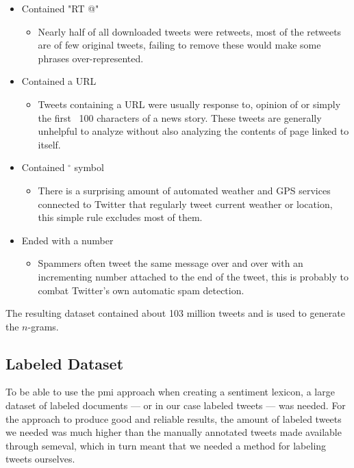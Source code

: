 \begin{itemize}
    \item Contained "RT @"
    \begin{itemize}
        \item Nearly half of all downloaded tweets were retweets, most of the retweets are of few original tweets, failing to remove these would make some phrases over-represented.
    \end{itemize}
    \item Contained a URL
    \begin{itemize}
        \item Tweets containing a URL were usually response to, opinion of or simply the first ~100 characters of a news story. These tweets are generally unhelpful to analyze without also analyzing the contents of page linked to itself. 
    \end{itemize}
    \item Contained $^{\circ}$ symbol
    \begin{itemize}
        \item There is a surprising amount of automated weather and GPS services connected to Twitter that regularly tweet current weather or location, this simple rule excludes most of them.
    \end{itemize}
    \item Ended with a number
    \begin{itemize}
        \item Spammers often tweet the same message over and over with an incrementing number attached to the end of the tweet, this is probably to combat Twitter's own automatic spam detection.
    \end{itemize}
\end{itemize}

The resulting dataset contained about 103 million tweets and is used to generate the $n$-grams.\\

\subsection*{Labeled Dataset}
\label{sec:labeled}
To be able to use the \ac{pmi} approach when creating a sentiment lexicon, a large dataset of labeled documents --- or in our case labeled tweets --- was needed. For the approach to produce good and reliable results, the amount of labeled tweets we needed was much higher than the manually annotated tweets made available through \ac{semeval}, which in turn meant that we needed a method for labeling tweets ourselves. \\

